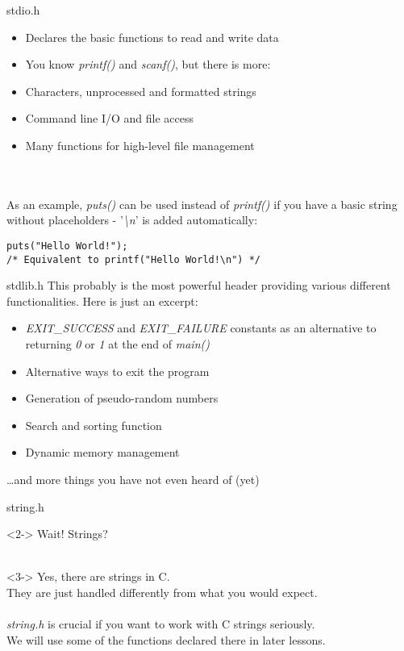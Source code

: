 \begin{frame}[fragile]{stdio.h}
	\begin{itemize}
		\item Declares the basic functions to read and write data
		\item You know \textit{printf()} and \textit{scanf()}, but there is more:
		\item Characters, unprocessed and formatted strings
		\item Command line I/O and file access
		\item Many functions for high-level file management
	\end{itemize} \ \\ \ \\
	As an example, \textit{puts()} can be used instead of \textit{printf()} if you have a basic string without placeholders - '\textit{\textbackslash n}' is added automatically:
	\begin{lstlisting}[numbers=none]
puts("Hello World!");
/* Equivalent to printf("Hello World!\n") */
\end{lstlisting}
\end{frame}
\begin{frame}{stdlib.h}
	This probably is the most powerful header providing various different functionalities. Here is just an excerpt:
	\begin{itemize}
		\item \textit{EXIT\_SUCCESS} and \textit{EXIT\_FAILURE} constants as an alternative to returning \textit{0} or \textit{1} at the end of \textit{main()}
		\item Alternative ways to exit the program
		\item Generation of pseudo-random numbers
		\item Search and sorting function
		\item Dynamic memory management
	\end{itemize}
		\dots and more things you have not even heard of (yet)
\end{frame}
\begin{frame}{string.h}
	\begin{uncoverenv}<2->
		Wait! Strings? \\ \ \\
	\end{uncoverenv}
	\begin{uncoverenv}<3->
		Yes, there are strings in C. \\
		They are just handled differently from what you would expect. \\ \ \\
		\textit{string.h} is crucial if you want to work with C strings seriously. \\
		We will use some of the functions declared there in later lessons.
	\end{uncoverenv}
\end{frame}
